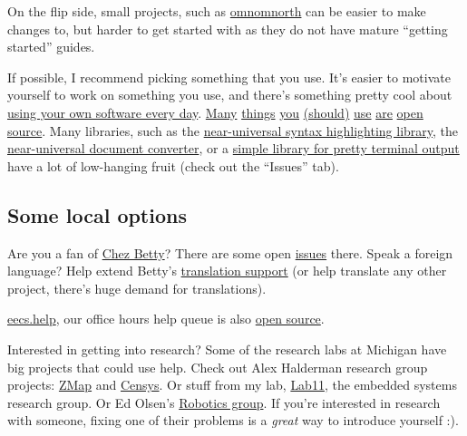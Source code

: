 \documentclass{article}
\begin{document}
On the flip side, small projects, such as
\href{https://github.com/kylelady/omnomnorth}{omnomnorth}
can be easier to make changes to, but harder to get started with as they do
not have mature ``getting started'' guides.

If possible, I recommend picking something that you use. It's easier to
motivate yourself to work on something you use, and there's something pretty
cool about \href{https://github.com/um-cseg/chez-betty/}{using your own
software every day}.
\href{https://github.com/Aluxian/Facebook-Messenger-Desktop}{Many}
\href{https://github.com/GNOME/gnome-terminal}{things}
\href{https://github.com/gnachman/iTerm2}{you}
\href{https://github.com/tmux/tmux}{(should)}
\href{https://trac.transmissionbt.com/wiki/Building}{use}
\href{https://github.com/scummvm/scummvm}{are}
\href{https://github.com/GNOME/gimp}{open}
\href{https://github.com/videolan/vlc}{source}.
Many libraries, such as the
\href{https://bitbucket.org/birkenfeld/pygments-main}
{near-universal syntax highlighting library}, the
\href{https://github.com/jgm/pandoc}
{near-universal document converter}, or a
\href{https://github.com/tartley/colorama}
{simple library for pretty terminal output}
have a lot of low-hanging fruit (check out the ``Issues'' tab).

\subsection*{Some local options}

Are you a fan of \href{https://chezbetty.eecs.umich.edu}{Chez Betty}? There
are some open \href{https://github.com/um-cseg/chez-betty/issues}{issues} there.
Speak a foreign language? Help extend Betty's
\href{https://github.com/um-cseg/chez-betty/blob/master/README.translation.md}{translation
support} (or help translate any other project, there's huge demand for
translations).

\href{https://eecs.help}{eecs.help}, our office hours help queue is also
\href{https://github.com/mterwill/classroom-help-queue/issues}{open source}.

Interested in getting into research? Some of the research labs at Michigan
have big projects that could use help. Check out Alex Halderman research group
projects: \href{https://github.com/zmap}{ZMap} and
\href{https://github.com/Censys}{Censys}. Or stuff from my lab,
\href{https://github.com/lab11}{Lab11}, the embedded systems research group.
Or Ed Olsen's \href{https://april.eecs.umich.edu/software/}{Robotics group}.
If you're interested in research with someone, fixing one of their problems is
a \emph{great} way to introduce yourself :).
\end{document}

